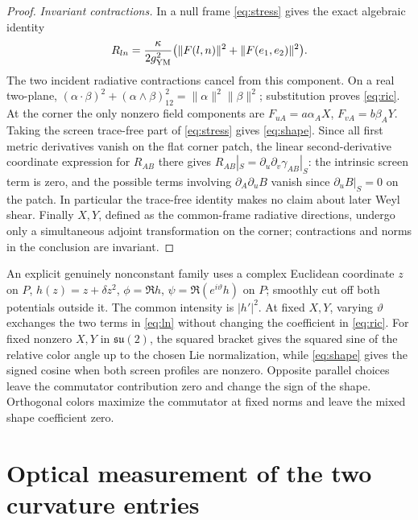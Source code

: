 \documentclass[11pt]{article}
\begin{document}
\begin{proof}
\emph{Invariant contractions.}
In a null frame \eqref{eq:stress} gives the exact algebraic identity
\begin{equation}
 R_{ln}=\frac{\kappa}{2g_{\rm YM}^2}
       \bigl(\|F(l,n)\|^2+\|F(e_1,e_2)\|^2\bigr).
 \label{eq:ln}
\end{equation}
The two incident radiative contractions cancel from this component. On a real two-plane,
\((\alpha\cdot\beta)^2+(\alpha\wedge\beta)_{12}^2=\|\alpha\|^2\|\beta\|^2\);
substitution proves \eqref{eq:ric}. At the corner the only nonzero field components are \(F_{uA}=a\alpha_A X\), \(F_{vA}=b\beta_A Y\). Taking the screen trace-free part of \eqref{eq:stress} gives \eqref{eq:shape}. Since all first metric derivatives vanish on the flat corner patch, the linear second-derivative coordinate expression for \(R_{AB}\) there gives \(R_{AB}|_S=\partial_u\partial_v\gamma_{AB}|_S\): the intrinsic screen term is zero, and the possible terms involving \(\partial_A\partial_uB\) vanish since \(\partial_uB|_S=0\) on the patch. In particular the trace-free identity makes no claim about later Weyl shear. Finally \(X,Y\), defined as the common-frame radiative directions, undergo only a simultaneous adjoint transformation on the corner; contractions and norms in the conclusion are invariant.
\end{proof}

An explicit genuinely nonconstant family uses a complex Euclidean coordinate \(z\) on \(P\), \(h(z)=z+\delta z^2\), \(\phi=\Re h\), \(\psi=\Re(e^{i\vartheta}h)\) on \(P\); smoothly cut off both potentials outside it. The common intensity is \(|h'|^2\). At fixed \(X,Y\), varying \(\vartheta\) exchanges the two terms in \eqref{eq:ln} without changing the coefficient in \eqref{eq:ric}. For fixed nonzero \(X,Y\) in \(\mathfrak{su}(2)\), the squared bracket gives the squared sine of the relative color angle up to the chosen Lie normalization, while \eqref{eq:shape} gives the signed cosine when both screen profiles are nonzero. Opposite parallel choices leave the commutator contribution zero and change the sign of the shape. Orthogonal colors maximize the commutator at fixed norms and leave the mixed shape coefficient zero.

\section{Optical measurement of the two curvature entries}
\end{document}
